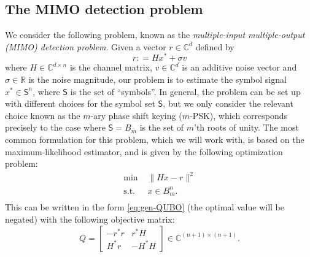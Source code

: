 \documentclass{article}
\newcommand{\RR}{\mathbb{R}}
\newcommand{\CC}{\mathbb{C}}
\theoremstyle{definition}
\begin{document}
\subsection{The MIMO detection problem}
\newcommand{\Symbols}{\mathsf{S}}
We consider the following problem, known as the \emph{multiple-input multiple-output (MIMO) detection problem}. Given a vector $r \in \CC^d$ defined by 
\begin{equation*}
    r : = Hx^*+\sigma v
\end{equation*}
where $H \in \CC^{d\times n}$ is the channel matrix, $v \in \CC^d$ is an additive noise vector and $\sigma \in \RR$ is the noise magnitude, our problem is to estimate the symbol signal $x^* \in \Symbols^n$, where $\Symbols$ is the set of ``symbols''.
In general, the problem can be set up with different choices for the symbol set $\Symbols$, but we only consider the relevant choice known as the $m$-ary phase shift keying ($m$-PSK), which corresponds precisely to the case where $\Symbols = B_m$ is the set of $m$'th roots of unity. 
The most common formulation for this problem, which we will work with, is based on the maximum-likelihood estimator, and is given by the following optimization problem: 
\begin{equation}\label{eq:MIMO-MLE}
    \begin{aligned}
        \text{min } & \|Hx-r\|^2\\
        \text{s.t. }&  x \in B^n_m. \\
    \end{aligned}
\end{equation}
This can be written in the form \eqref{eq:gen-QUBO} (the optimal value will be negated) with the following objective matrix:
\begin{equation}
    Q = \begin{bmatrix}
        -r^*r & r^*H \\
        H^*r & -H^*H 
    \end{bmatrix} \in \CC^{(n+1)\times (n+1)}.
\end{equation}
\end{document}
